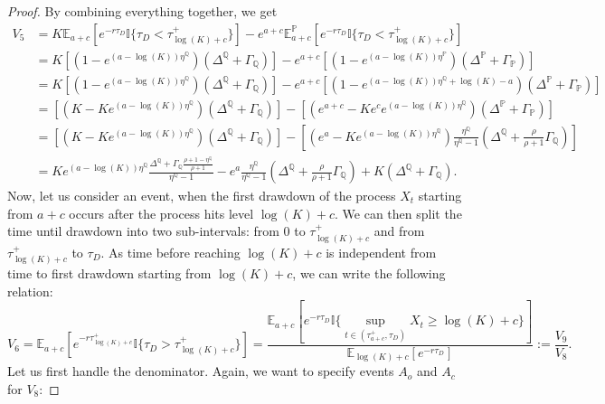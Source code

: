 \documentclass[10pt]{amsart}
\def\E{{\mathbb{E}}}
\def\P{{\mathbb{P}}}
\def\Q{{\mathbb{Q}}}
\def \R{{{\rm I{\!}\rm R}}}
\def \I{{\mathbb{I}}}
\def\P{{\mathbb P}} \def\le{\left} \def\ri{\right} \def\i{\infty}
\def\E{{\mathbb E}} \def\PP{\mc P} \def\Z{{\mathbb Z}} \def\R{{\mathbb R}}
\begin{document}
\begin{proof}
			
			By combining everything together, we get
			\begin{align}
				\nonumber V_5 &= K\E_{a+c} \left[ e^{-r\tau_D} \I \{ \tau_D < \tau_{\log(K)+c}^+ \} \right] - e^{a+c}\E^\P_{a+c} \left[ e^{-r\tau_D} \I \{ \tau_D < \tau_{\log(K)+c}^+ \} \right] \\
				\nonumber & = K\left[ \left(1 - e^{(a-\log(K))\eta^\Q}\right)\left( \Delta^\Q + \Gamma_\Q \right)  \right] - e^{a+c}\left[ \left(1 - e^{(a-\log(K))\eta^\P}\right)\left( \Delta^\P + \Gamma_\P \right)  \right] \\
				\nonumber & = K\left[ \left(1 - e^{(a-\log(K))\eta^\Q}\right)\left( \Delta^\Q + \Gamma_\Q \right)  \right] - e^{a+c}\left[ \left(1 - e^{(a-\log(K))\eta^\Q + \log(K)-a}\right)\left( \Delta^\P + \Gamma_\P \right)  \right] \\
				\nonumber & = \left[ \left(K - Ke^{(a-\log(K))\eta^\Q}\right)\left( \Delta^\Q + \Gamma_\Q \right)  \right] - \left[ \left(e^{a+c} - Ke^ce^{(a-\log(K))\eta^\Q}\right)\left( \Delta^\P + \Gamma_\P \right)  \right] \\
				\nonumber & = \left[ \left(K - Ke^{(a-\log(K))\eta^\Q}\right)\left( \Delta^\Q + \Gamma_\Q \right)  \right] - \left[ \left(e^{a} - Ke^{(a-\log(K))\eta^\Q}\right)\frac{\eta^\Q}{\eta^\Q-1}\left( \Delta^\Q + \frac{\rho}{\rho+1}\Gamma_\Q \right)  \right] \\
				& = Ke^{(a-\log(K))\eta^\Q}\frac{\Delta^\Q + \Gamma_\Q \frac{\rho+1-\eta^\Q}{\rho+1}}{\eta^\Q-1} - e^a \frac{\eta^\Q}{\eta^\Q-1}\left( \Delta^\Q + \frac{\rho}{\rho+1}\Gamma_\Q \right) + K\left( \Delta^\Q + \Gamma_\Q \right). \label{V5}
			\end{align}		
			Now, let us consider an event, when the first drawdown of the process $X_t$ starting from $a+c$ occurs after the process hits level $\log(K) + c$. We can then split the time until drawdown into two sub-intervals: from 0 to $\tau_{\log(K)+c}^+$ and from $\tau_{\log(K)+c}^+$ to $\tau_D$. As time before reaching $\log(K)+c$ is independent from time to first drawdown starting from $\log(K)+c$, we can write the following relation:
			\begin{equation}\label{V6_1st}
				V_6 = \E_{a+c}\left[ e^{-r\tau_{\log(K)+c}^+}  \I
				\{ \tau_D > \tau_{\log(K)+c}^+ \} \right] = \frac{\E_{a+c}\left[ e^{-r\tau_D}  \I
					\{ \sup_{t \in (\tau^+_{a+c},\tau_D)} X_t \geq \log(K)+c \} \right]}{\E_{\log(K)+c}\left[ e^{-r\tau_D}\right]} := \frac{V_9}{V_8}.
			\end{equation}	
			Let us first handle the denominator. Again, we want to specify events $A_o$ and $A_c$ for $V_8$:		

\end{proof}
\end{document}
